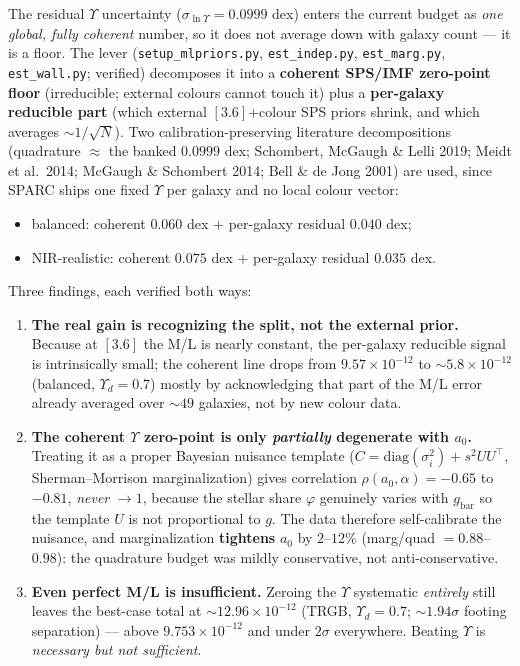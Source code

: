 \documentclass[
]{article}
\providecommand{\tightlist}{%
  \setlength{\itemsep}{0pt}\setlength{\parskip}{0pt}}
\begin{document}
The residual \(\Upsilon\) uncertainty (\(\sigma_{\ln\Upsilon}=0.0999\)
dex) enters the current budget as \emph{one global, fully coherent}
number, so it does not average down with galaxy count --- it is a floor.
The lever (\texttt{setup\_mlpriors.py}, \texttt{est\_indep.py},
\texttt{est\_marg.py}, \texttt{est\_wall.py}; verified) decomposes it
into a \textbf{coherent SPS/IMF zero-point floor} (irreducible; external
colours cannot touch it) plus a \textbf{per-galaxy reducible part}
(which external \([3.6]\)+colour SPS priors shrink, and which averages
\(\sim1/\sqrt N\)). Two calibration-preserving literature decompositions
(quadrature \(\approx\) the banked \(0.0999\) dex; Schombert, McGaugh \&
Lelli 2019; Meidt et al.~2014; McGaugh \& Schombert 2014; Bell \& de
Jong 2001) are used, since SPARC ships one fixed \(\Upsilon\) per galaxy
and no local colour vector:

\begin{itemize}
\tightlist
\item
  balanced: coherent \(0.060\) dex + per-galaxy residual \(0.040\) dex;
\item
  NIR-realistic: coherent \(0.075\) dex + per-galaxy residual \(0.035\)
  dex.
\end{itemize}

Three findings, each verified both ways:

\begin{enumerate}
\def\labelenumi{\arabic{enumi}.}
\item
  \textbf{The real gain is recognizing the split, not the external
  prior.} Because at \([3.6]\) the M/L is nearly constant, the
  per-galaxy reducible signal is intrinsically small; the coherent line
  drops from \(9.57\times10^{-12}\) to \(\sim5.8\times10^{-12}\)
  (balanced, \(\Upsilon_d=0.7\)) mostly by acknowledging that part of
  the M/L error already averaged over \(\sim49\) galaxies, not by new
  colour data.
\item
  \textbf{The coherent \(\Upsilon\) zero-point is only \emph{partially}
  degenerate with \(a_0\).} Treating it as a proper Bayesian nuisance
  template (\(C=\mathrm{diag}(\sigma_i^2)+s^2 UU^\top\),
  Sherman--Morrison marginalization) gives correlation
  \(\rho(a_0,\alpha)=-0.65\) to \(-0.81\), \emph{never} \(\to1\),
  because the stellar share \(\varphi\) genuinely varies with
  \(g_\mathrm{bar}\) so the template \(U\) is not proportional to \(g\).
  The data therefore self-calibrate the nuisance, and marginalization
  \textbf{tightens} \(a_0\) by \(2\)--\(12\%\) (marg/quad
  \(=0.88\)--\(0.98\)): the quadrature budget was mildly conservative,
  not anti-conservative.
\item
  \textbf{Even perfect M/L is insufficient.} Zeroing the \(\Upsilon\)
  systematic \emph{entirely} still leaves the best-case total at
  \(\sim12.96\times10^{-12}\) (TRGB, \(\Upsilon_d=0.7\);
  \(\sim1.94\sigma\) footing separation) --- above
  \(9.753\times10^{-12}\) and under \(2\sigma\) everywhere. Beating
  \(\Upsilon\) is \emph{necessary but not sufficient}.
\end{enumerate}
\end{document}
